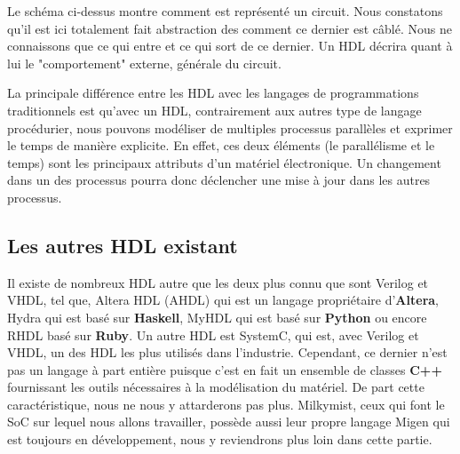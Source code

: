Le schéma ci-dessus montre comment est représenté un circuit. Nous constatons qu'il est ici totalement fait abstraction des comment ce dernier est câblé. Nous ne connaissons que ce qui entre et ce qui sort de ce dernier. Un HDL décrira quant à lui le "comportement" externe, générale du circuit.

La principale différence entre les HDL avec les langages de programmations traditionnels est qu'avec un HDL, contrairement aux autres type de langage procédurier, nous pouvons modéliser de multiples processus parallèles et exprimer le temps de manière explicite. En effet, ces deux éléments (le parallélisme et le temps) sont les principaux attributs d'un matériel électronique. Un changement dans un des processus pourra donc déclencher une mise à jour dans les autres processus.

\subsection{Les autres HDL existant}
\vspace{15px}
Il existe de nombreux HDL autre que les deux plus connu que sont Verilog et VHDL, tel que, Altera HDL (AHDL) qui est un langage propriétaire d'\textbf{Altera}, Hydra qui est basé sur \textbf{Haskell}, MyHDL qui est basé sur \textbf{Python} ou encore RHDL basé sur \textbf{Ruby}. Un autre HDL est SystemC, qui est, avec Verilog et VHDL, un des HDL les plus utilisés dans l'industrie. Cependant, ce dernier n'est pas un langage à part entière puisque c'est en fait un ensemble de classes \textbf{C++} fournissant les outils nécessaires à la modélisation du matériel. De part cette caractéristique, nous ne nous y attarderons pas plus. Milkymist, ceux qui font le SoC sur lequel nous allons travailler, possède aussi leur propre langage Migen qui est toujours en développement, nous y reviendrons plus loin dans cette partie.

